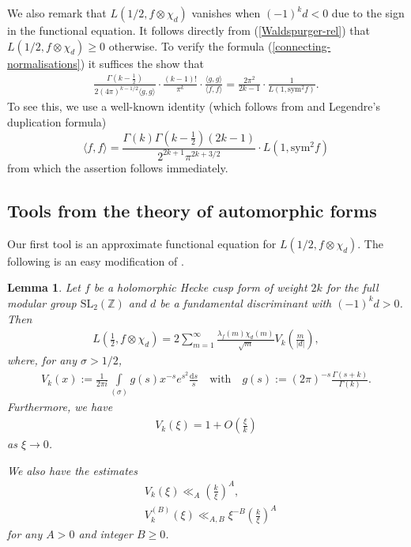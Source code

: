\documentclass[a4paper,10pt,twoside]{amsart}
\newtheorem{lemma}[theorem]{Lemma}
\theoremstyle{definition}
\numberwithin{equation}{section}
\renewcommand\:{\colon}
\begin{document}
We also remark that $L(1/2,f\otimes\chi_d)$ vanishes when $(-1)^kd<0$ due to the sign in the functional equation. It follows directly from (\ref{Waldspurger-rel}) that $L(1/2,f\otimes\chi_d)\geq 0$ otherwise. To verify the formula (\ref{connecting-normalisations}) it suffices the show that 
\begin{align}\label{omega_alpha} 
\frac{\Gamma\left(k-\frac12\right)}{2(4\pi)^{k-1/2}\langle g,g\rangle}\cdot\frac{(k-1)!}{\pi^k}\cdot\frac{\langle g,g\rangle}{\langle f,f\rangle}=\frac{2\pi^2}{2k-1}\cdot\frac1{L(1,\text{sym}^2f)}.
\end{align}
To see this, we use a well-known identity (which follows from \cite[(7)]{Nelson2011} and Legendre's duplication formula)
\[ 
\langle f,f\rangle=\frac{\Gamma(k)\Gamma\left(k-\frac12\right)(2k-1)}{2^{2k+1}\pi^{2k+3/2}}\cdot L(1,\text{sym}^2f)\]
from which the assertion follows immediately. 

\subsection{Tools from the theory of automorphic forms}
Our first tool is an approximate functional equation for $L(1/2,f\otimes\chi_d)$. The following is an easy modification of \cite[Lemma 5]{Radziwill-Soundararajan2015}. 
\begin{lemma}\label{lem:AFE}
Let $f$ be a holomorphic Hecke cusp form of weight $2k$ for the full modular group $\mathrm{SL}_2(\mathbb Z)$ and $d$ be a fundamental discriminant with $(-1)^kd>0$. Then
\begin{align*}
L\left(\frac12,f\otimes\chi_d\right)=2\sum_{m=1}^\infty\frac{\lambda_f(m)\chi_d(m)}{\sqrt m}V_k\left(\frac m{|d|}\right),
\end{align*}
where, for any $\sigma>1/2$,
\begin{align}\label{integral-rep-for-weight}
V_k(x):=\frac1{2\pi i}\int\limits_{(\sigma)}g(s)x^{-s}e^{s^2}\frac{\mathrm d s}s\quad\text{with}\quad g(s):=(2\pi)^{-s}\frac{\Gamma(s+k)}{\Gamma(k)}.
\end{align}
Furthermore, we have 
\begin{align*}\label{weight-function-asymptotics}
V_k(\xi)=1+O\left(\frac\xi k\right)
\end{align*}
as $\xi\longrightarrow 0$.

We also have the estimates
\begin{align*}
& V_k(\xi)\ll_A \left(\frac k\xi\right)^A, \\
&V_k^{(B)}(\xi)\ll_{A,B}\xi^{-B}\left(\frac k\xi\right)^A
\end{align*}
for any $A>0$ and integer $B\geq 0$.
\end{lemma}
\end{document}
